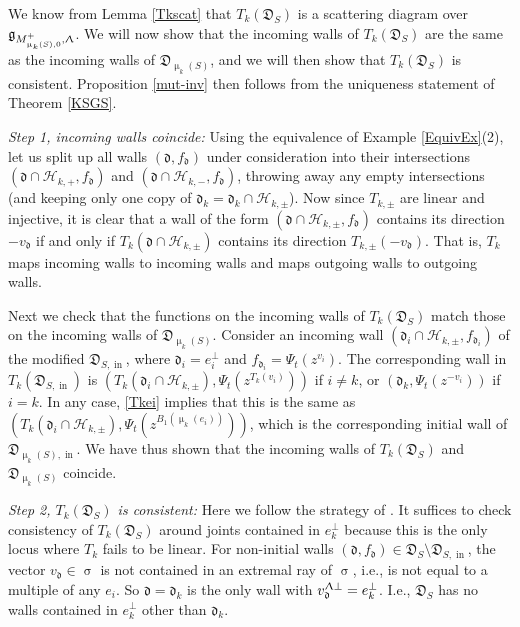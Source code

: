 \documentclass{amsart}
\DeclareMathOperator{\In}{in}
\let\f=\mathfrak
\let\s=\mathcal
\renewcommand{\sigma}{\upsigma}
\renewcommand{\Lambda}{\Uplambda}
\renewcommand{\mu}{\upmu}
\theoremstyle{plain}%
\theoremstyle{definition}
\theoremstyle{remark}
\newenvironment{myproof}[1][\proofname]{\proof[#1]\mbox{}}{\endproof}
\begin{document}
\begin{myproof}[Proof of Proposition \ref{mut-inv}]
We know from Lemma \ref{Tkscat} that $T_k(\f{D}_S)$ is a scattering diagram over $\f{g}_{M_{\mu_k(S),0}^+,\Lambda}$.  We will now show that the incoming walls of $T_k(\f{D}_S)$ are the same as the incoming walls of $\f{D}_{\mu_k(S)}$, and we will then show that $T_k(\f{D}_S)$ is consistent.  Proposition \ref{mut-inv} then follows from the uniqueness statement of Theorem \ref{KSGS}.

\textit{Step 1, incoming walls coincide:}  Using the equivalence of Example \ref{EquivEx}(2), let us split up all walls $(\f{d},f_{\f{d}})$ under consideration into their intersections $(\f{d}\cap \s{H}_{k,+},f_{\f{d}})$ and $(\f{d}\cap \s{H}_{k,-},f_{\f{d}})$, throwing away any empty intersections (and keeping only one copy of $\f{d}_k=\f{d}_k\cap \s{H}_{k,\pm}$).  Now since $T_{k,\pm}$ are linear and injective, it is clear that a wall of the form $(\f{d}\cap \s{H}_{k,\pm},f_{\f{d}})$ contains its direction $-v_{\f{d}}$ if and only if $T_k(\f{d}\cap \s{H}_{k,\pm})$ contains its direction $T_{k,\pm}(-v_{\f{d}})$.  That is, $T_k$ maps incoming walls to incoming walls and maps outgoing walls to outgoing walls.

Next we check that the functions on the incoming walls of $T_k(\f{D}_S)$ match those on the incoming walls of $\f{D}_{\mu_k(S)}$.  Consider an incoming wall $(\f{d}_i\cap \s{H}_{k,\pm},f_{\f{d}_i})$ of the modified $\f{D}_{S,\In}$, where $\f{d}_i=e_i^{\perp}$ and $f_{\f{d}_i}=\Psi_t( z^{v_i})$.  The corresponding wall in $T_k(\f{D}_{S,\In})$ is $(T_k(\f{d}_i\cap \s{H}_{k,\pm}),\Psi_t(z^{T_k(v_i)}))$ if $i\neq k$, or $(\f{d}_k,\Psi_t(z^{-v_i}))$ if $i=k$.  In any case, \eqref{Tkei} implies that this is the same as $(T_k(\f{d}_i\cap \s{H}_{k,\pm}),\Psi_t( z^{B_1(\mu_k(e_i))}))$, which is the corresponding initial wall of $\f{D}_{\mu_k(S),\In}$.  We have thus shown that the incoming walls of $T_k(\f{D}_S)$ and $\f{D}_{\mu_k(S)}$ coincide.

\textit{Step 2, $T_k(\f{D}_S)$ is consistent:} Here we follow the strategy of \cite[Proof of Thm. 1.24, Step II]{GHKK}.  
It suffices to check consistency of $T_k(\f{D}_S)$ around joints contained in $e_k^{\perp}$ because this is the only locus where $T_k$ fails to be linear.  For non-initial walls $(\f{d},f_{\f{d}})\in \f{D}_{S}\setminus \f{D}_{S,\In}$, the vector $v_{\f{d}}\in \sigma$ is not contained in an extremal ray of $\sigma$, i.e., is not equal to a multiple of any $e_i$.  So $\f{d}=\f{d}_k$ is the only wall with $v_{\f{d}}^{\Lambda\perp}=e_k^{\perp}$.  I.e., $\f{D}_S$ has no walls contained in $e_k^{\perp}$ other than $\f{d}_k$.






\end{myproof}
\end{document}
